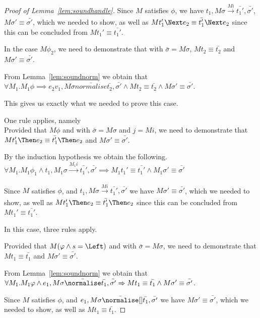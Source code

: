 \begin{proof}[Proof of Lemma~\ref{lem:soundhandle}]
{  Since $M$ satisfies $\phi$, we have $t_1,M\sigma \xrightarrow[]{M i} \bar{t_1'},\bar{\sigma'}$, $M\sigma'\equiv\bar{\sigma'}$,
  which we needed to show, as well as $M t_1' \Next e_2 \equiv \bar{t_1'}\Next e_2$ since this can be concluded from $M t_1'\equiv \bar{t_1'}$.

  In the case $M\phi_2$, we need to demonstrate that  with $\bar{\sigma}=M\sigma$,
  $M t_2 \equiv \bar{t_2}$ and $M\sigma'\equiv\bar{\sigma'}$.

  From Lemma~\ref{lem:soundnorm} we obtain that $\forall M_1. M_1 \phi \implies e_2 v_1,M\sigma\bar{normalise}\bar{t_2},\bar{\sigma'}\land M t_2\equiv\bar{t_2}\land M \sigma'\equiv\bar{\sigma'}$.

  This gives us exactly what we needed to prove this case.
  }

  {One rule applies, namely \\
  Provided that $M\phi$ and  with $\bar{\sigma}=M\sigma$ and $j= M i$,
  we need to demonstrate that $M t_1'\Then e_2\equiv \bar{t_1'}\Then e_2$ and $M\sigma'\equiv\bar{\sigma'}$.

  By the induction hypothesis we obtain the following.\\
  $\forall M_1 . M_1 \phi_1 \land t_1,M_1\sigma \xrightarrow[]{M_1 i} \bar{t_1'},\bar{\sigma'}\implies M_1 t_1'\equiv\bar{t_1'}\land M_1\sigma' \equiv \bar{\sigma'}$

  Since $M$ satisfies $\phi$, and $t_1,M\sigma \xrightarrow[]{M i} \bar{t_1'},\bar{\sigma'}$ we have $M\sigma'\equiv\bar{\sigma'}$,
  which we needed to show, as well as $M t_1' \Then e_2 \equiv \bar{t_1'}\Then e_2$ since this can be concluded from $M t_1'\equiv \bar{t_1'}$.

  }

  {
  In this case, three rules apply.\\
    {
    }
    {Provided that $M(\phi\wedge s=\Left)$ and  with $\bar{\sigma}=M\sigma$,
    we need to demonstrate that $M t_1\equiv \bar{t_1}$ and $M\sigma'\equiv \bar{\sigma'}$.

    From Lemma~\ref{lem:soundnorm} we obtain that $\forall M_1. M_1 \phi \land e_1,M\sigma\bar{\normalise}\bar{t_1},\bar{\sigma'}\implies M t_1\equiv\bar{t_1}\land M \sigma'\equiv\bar{\sigma'}$.

    Since $M$ satisfies $\phi$, and $e_1,M\sigma \bar{\normalise}[] \bar{t_1},\bar{\sigma'}$ we have $M\sigma'\equiv\bar{\sigma'}$,
    which we needed to show, as well as $M t_1 \equiv \bar{t_1}$.

}}
\end{proof}
